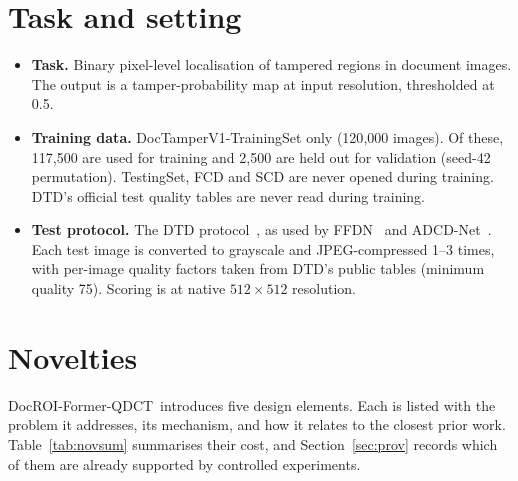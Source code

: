 \documentclass[10pt,a4paper]{article}
\newcommand{\ours}{DocROI-Former-QDCT}
\begin{document}
\section{Task and setting}
\begin{itemize}
  \item \textbf{Task.} Binary pixel-level localisation of tampered regions in document
        images. The output is a tamper-probability map at input resolution, thresholded
        at 0.5.
  \item \textbf{Training data.} DocTamperV1-TrainingSet only (120{,}000 images). Of these,
        117{,}500 are used for training and 2{,}500 are held out for validation
        (seed-42 permutation). TestingSet, FCD and SCD are never opened during training.
        DTD's official test quality tables are never read during training.
  \item \textbf{Test protocol.} The DTD protocol~\cite{dtd}, as used by
        FFDN~\cite{ffdn} and ADCD-Net~\cite{adcd}. Each test image is converted to
        grayscale and JPEG-compressed 1--3 times, with per-image quality factors taken
        from DTD's public tables (minimum quality 75). Scoring is at native
        $512\times512$ resolution.
\end{itemize}

\section{Novelties}\label{sec:novelty}
\ours\ introduces five design elements. Each is listed with the problem it addresses, its
mechanism, and how it relates to the closest prior work. Table~\ref{tab:novsum} summarises
their cost, and Section~\ref{sec:prov} records which of them are already supported by
controlled experiments.
\end{document}
